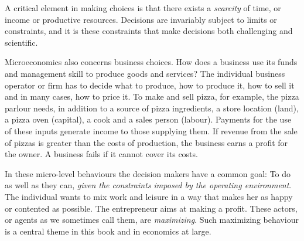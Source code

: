 A critical element in making choices is that there exists a \textit{scarcity}
of time, or income or productive resources. Decisions are invariably subject
to limits or constraints, and it is these constraints that make decisions
both challenging and scientific.

\newhtmlpage

Microeconomics also concerns business choices. How does a business use its
funds and management skill to produce goods and services? The individual
business operator or firm has to decide what to produce, how to produce it,
how to sell it and in many cases, how to price it. To make and sell pizza,
for example, the pizza parlour needs, in addition to a source of pizza
ingredients, a store location (land), a pizza oven (capital), a cook and a
sales person (labour). Payments for the use of these inputs generate income
to those supplying them. If revenue from the sale of pizzas is greater than
the costs of production, the business earns a profit for the owner. A
business fails if it cannot cover its costs.

In these micro-level behaviours the decision makers have a common goal: To
do as well as they can, \textit{given the constraints imposed by the 
operating environment}. The individual wants to mix work and leisure in a
way that makes her as happy or contented as possible. The entrepreneur aims
at making a profit. These actors, or agents as we sometimes call them, are 
\textit{maximizing}. Such maximizing behaviour is a central theme in this
book and in economics at large.

\newhtmlpage

